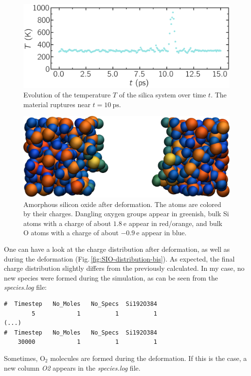\documentclass[9pt,tutorial]{livecoms}
\begin{document}
\begin{figure}
\includegraphics[width=\linewidth]{SIO-temperature}
\caption{Evolution of the temperature $T$ of the silica system over time $t$. The material ruptures near $t = 10~\text{ps}$.}
\label{fig:SIO-temperature}
\end{figure}

\begin{figure}
\includegraphics[width=\linewidth]{SIO-deformed}
\caption{Amorphous silicon oxide after deformation. The atoms are colored by their charges. Dangling oxygen groups appear in greenish, bulk Si atoms with a charge of about $1.8~\text{e}$  appear in red/orange, and bulk O atoms with a charge of about $-0.9 ~ \text{e}$ appear in blue.}
\label{fig:SIO-deformed}
\end{figure}

One can have a look at the charge distribution after deformation, as well as during the deformation (Fig.\,\ref{fig:SIO-distribution-bis}). As expected, the final charge distribution slightly differs from the previously calculated. In my case, no new species were formed during the simulation, as can be seen from the \textit{species.log} file:
{\normalsize \begin{verbatim}
#  Timestep   No_Moles   No_Specs  Si192O384
        5            1          1          1
(...)
#  Timestep   No_Moles   No_Specs  Si192O384
    30000            1          1          1
\end{verbatim}}
Sometimes, $\text{O}_2$ molecules are formed during the deformation. If this is the case, a new column \textit{O2} appears in the \textit{species.log} file.
\end{document}
